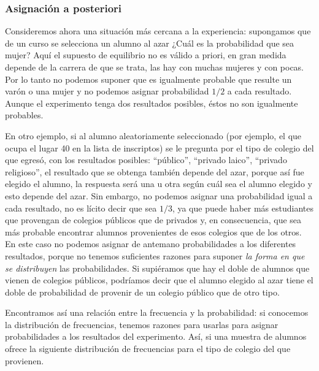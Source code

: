 \documentclass[]{article}
\begin{document}
\hypertarget{asignaciuxf3n-a-posteriori}{%
\subsubsection{Asignación a
posteriori}\label{asignaciuxf3n-a-posteriori}}

Consideremos ahora una situación más cercana a la experiencia:
supongamos que de un curso se selecciona un alumno al azar ¿Cuál es la
probabilidad que sea mujer? Aquí el supuesto de equilibrio no es válido
a priori, en gran medida depende de la carrera de que se trata, las hay
con muchas mujeres y con pocas. Por lo tanto no podemos suponer que es
igualmente probable que resulte un varón o una mujer y no podemos
asignar probabilidad \(1/2\) a cada resultado. Aunque el experimento
tenga dos resultados posibles, éstos no son igualmente probables.

En otro ejemplo, si al alumno aleatoriamente seleccionado (por ejemplo,
el que ocupa el lugar 40 en la lista de inscriptos) se le pregunta por
el tipo de colegio del que egresó, con los resultados posibles:
``público'', ``privado laico'', ``privado religioso'', el resultado que
se obtenga también depende del azar, porque así fue elegido el alumno,
la respuesta será una u otra según cuál sea el alumno elegido y esto
depende del azar. Sin embargo, no podemos asignar una probabilidad igual
a cada resultado, no es lícito decir que sea \(1/3\), ya que puede haber
más estudiantes que provengan de colegios públicos que de privados y, en
consecuencia, que sea más probable encontrar alumnos provenientes de
esos colegios que de los otros. En este caso no podemos asignar de
antemano probabilidades a los diferentes resultados, porque no tenemos
suficientes razones para suponer \emph{la forma en que se distribuyen}
las probabilidades. Si supiéramos que hay el doble de alumnos que vienen
de colegios públicos, podríamos decir que el alumno elegido al azar
tiene el doble de probabilidad de provenir de un colegio público que de
otro tipo.

Encontramos así una relación entre la frecuencia y la probabilidad: si
conocemos la distribución de frecuencias, tenemos razones para usarlas
para asignar probabilidades a los resultados del experimento. Así, si
una muestra de alumnos ofrece la siguiente distribución de frecuencias
para el tipo de colegio del que provienen.
\end{document}
